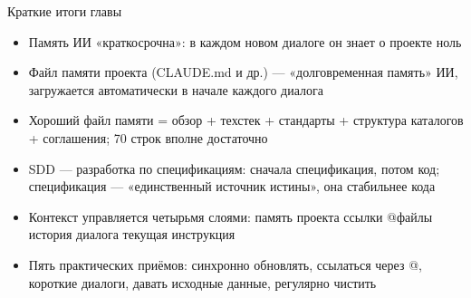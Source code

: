 \begin{tcbsummary}{Краткие итоги главы}
\begin{itemize}
  \item Память ИИ «краткосрочна»: в каждом новом диалоге он знает о проекте ноль
  \item Файл памяти проекта (CLAUDE.md и др.) — «долговременная память» ИИ, загружается автоматически в начале каждого диалога
  \item Хороший файл памяти = обзор + техстек + стандарты + структура каталогов + соглашения; 70 строк вполне достаточно
  \item SDD — разработка по спецификациям: сначала спецификация, потом код; спецификация — «единственный источник истины», она стабильнее кода
  \item Контекст управляется четырьмя слоями: память проекта ссылки @файлы история диалога текущая инструкция
  \item Пять практических приёмов: синхронно обновлять, ссылаться через @, короткие диалоги, давать исходные данные, регулярно чистить
\end{itemize}

\end{tcbsummary}
